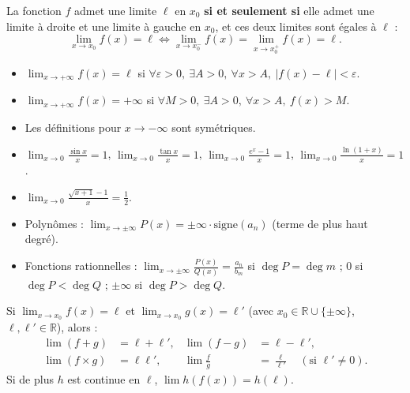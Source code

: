 \documentclass[11pt]{article}
\begin{document}
\begin{propriete}
La fonction $f$ admet une limite $\ell$ en $x_0$ \textbf{si et seulement si} elle admet une limite à droite et une limite à gauche en $x_0$, et ces deux limites sont égales à $\ell$ :
\[ \lim_{x\to x_0}f(x)=\ell \iff \lim_{x\to x_0^-}f(x)=\lim_{x\to x_0^+}f(x)=\ell. \]
\end{propriete}

\begin{definition}
\begin{itemize}
\item $\displaystyle\lim_{x\to +\infty}f(x)=\ell$ si $\forall \varepsilon>0,\ \exists A>0,\ \forall x>A,\ |f(x)-\ell|<\varepsilon$.
\item $\displaystyle\lim_{x\to +\infty}f(x)=+\infty$ si $\forall M>0,\ \exists A>0,\ \forall x>A,\ f(x)>M$.
\item Les définitions pour $x\to -\infty$ sont symétriques.
\end{itemize}
\end{definition}

\begin{aretenir}
\begin{itemize}
\item $\displaystyle\lim_{x\to 0}\frac{\sin x}{x}=1$, \quad $\displaystyle\lim_{x\to 0}\frac{\tan x}{x}=1$, \quad $\displaystyle\lim_{x\to 0}\frac{e^x-1}{x}=1$, \quad $\displaystyle\lim_{x\to 0}\frac{\ln(1+x)}{x}=1$.
\item $\displaystyle\lim_{x\to 0}\frac{\sqrt{x+1}-1}{x}=\frac{1}{2}$.
\item Polynômes : $\displaystyle\lim_{x\to \pm\infty}P(x)=\pm\infty \cdot \text{signe}(a_n)$ (terme de plus haut degré).
\item Fonctions rationnelles : $\displaystyle\lim_{x\to \pm\infty}\frac{P(x)}{Q(x)}=\frac{a_n}{b_m}$ si $\deg P = \deg m$ ; $0$ si $\deg P < \deg Q$ ; $\pm\infty$ si $\deg P > \deg Q$.
\end{itemize}
\end{aretenir}

\begin{propriete}
Si $\lim_{x\to x_0}f(x)=\ell$ et $\lim_{x\to x_0}g(x)=\ell'$ (avec $x_0 \in \mathbb{R}\cup\{\pm\infty\}$, $\ell,\ell'\in\mathbb{R}$), alors :
\begin{align*}
\lim (f+g) &= \ell+\ell', & \lim (f-g) &= \ell-\ell', \\
\lim (f\times g) &= \ell\ell', & \lim \frac{f}{g} &= \frac{\ell}{\ell'} \quad (\text{si } \ell'\neq 0).
\end{align*}
Si de plus $h$ est continue en $\ell$, $\lim h(f(x)) = h(\ell)$.
\end{propriete}
\end{document}
